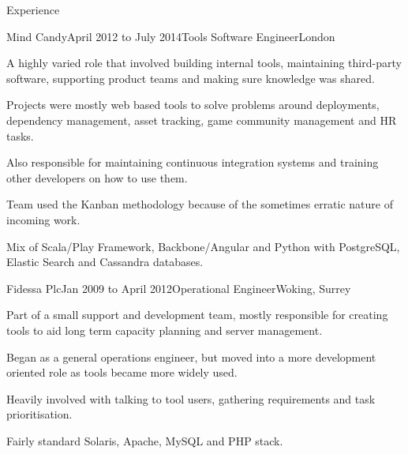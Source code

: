 \documentclass{resume} %
\begin{document}
\begin{rSection}{Experience}

  \begin{rExperience}{Mind Candy}{April 2012 to July 2014}{Tools Software Engineer}{London}
  \item A highly varied role that involved building internal tools, maintaining third-party software, supporting product teams and making sure knowledge was shared.
  \item Projects were mostly web based tools to solve problems around deployments, dependency management, asset tracking, game community management and HR tasks.
  \item Also responsible for maintaining continuous integration systems and training other developers on how to use them.
  \item Team used the Kanban methodology because of the sometimes erratic nature of incoming work.
  \item Mix of Scala/Play Framework, Backbone/Angular and Python with PostgreSQL, Elastic Search and Cassandra databases.
  \end{rExperience}


  \begin{rExperience}{Fidessa Plc}{Jan 2009 to April 2012}{Operational Engineer}{Woking, Surrey}
  \item Part of a small support and development team, mostly responsible for creating tools to aid long term capacity planning and server management.
  \item Began as a general operations engineer, but moved into a more development oriented role as tools became more widely used.
  \item Heavily involved with talking to tool users, gathering requirements and task prioritisation.
  \item Fairly standard Solaris, Apache, MySQL and PHP stack.
  \end{rExperience}

\end{rSection}

\pagebreak

\end{document}
